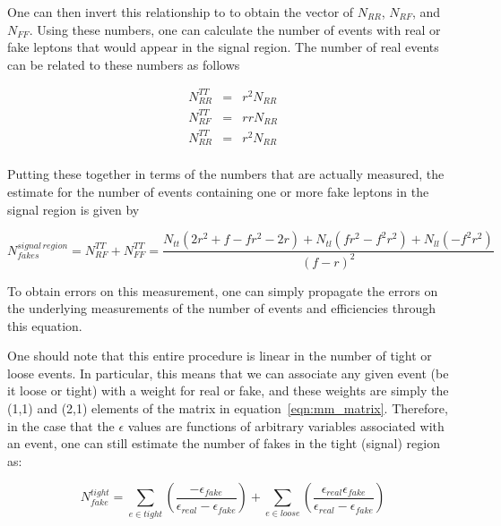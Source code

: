 One can then invert this relationship to to obtain the vector of $N_{RR}$, $N_{RF}$, and $N_{FF}$.
Using these numbers, one can calculate the number of events with real or fake leptons that would appear in the signal region.
The number of real events can be related to these numbers as follows

\begin{eqnarray*}
  N_{RR}^{TT} & = & r^2 N_{RR} \\
  N_{RF}^{TT} & = & r r N_{RR} \\
  N_{RR}^{TT} & = & r^2 N_{RR} \\
\end{eqnarray*}

Putting these together in terms of the numbers that are actually measured, the estimate for the number of events containing one or more fake leptons in the signal region is given by

\begin{equation}
N_{fakes}^{signal \, region} =  N_{RF}^{TT} + N_{FF}^{TT} = \frac{ N_{tt}(2r^2 + f - fr^2-2r) + N_{tl}(fr^2-f^2r^2) + N_{ll}(-f^2r^2) }{(f-r)^2} 
\end{equation}

To obtain errors on this measurement, one can simply propagate the errors on the underlying measurements of the number of events and efficiencies through this equation.

One should note that this entire procedure is linear in the number of tight or loose events.
In particular, this means that we can associate any given event (be it loose or tight) with a weight for real or fake,
and these weights are simply the (1,1) and (2,1) elements of the matrix in equation~\ref{eqn:mm_matrix}.
Therefore, in the case that the $\epsilon$ values are functions of arbitrary variables associated with an event, one can still estimate the number of fakes in the tight (signal) region as:

\begin{equation}
  N^{tight}_{fake} = \sum_{e \in tight} (\frac{-\epsilon_{fake}}{\epsilon_{real} - \epsilon_{fake}}) + \sum_{e \in loose} (\frac{\epsilon_{real}\epsilon_{fake}}{\epsilon_{real} - \epsilon_{fake}})
  \label{eq:MatrixMethodSum}
\end{equation}


